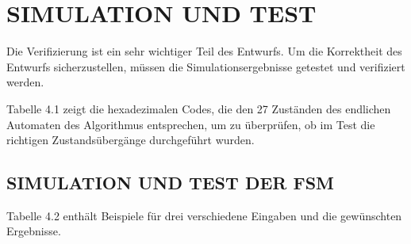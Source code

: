 \chapter{SIMULATION UND TEST}
\label{sec:implementation}

Die Verifizierung ist ein sehr wichtiger Teil des Entwurfs. Um die Korrektheit des Entwurfs sicherzustellen, müssen die Simulationsergebnisse getestet und verifiziert werden.

\vspace{\baselineskip}

\noindent Tabelle 4.1 zeigt die hexadezimalen Codes, die den 27 Zuständen des endlichen Automaten des Algorithmus entsprechen, um zu überprüfen, ob im Test die richtigen Zustandsübergänge durchgeführt wurden.

\begin{table}[H]
    \caption{Hexadezimale Codierung der Zustände}
\end{table}

\section{SIMULATION UND TEST DER FSM}

Tabelle 4.2 enthält Beispiele für drei verschiedene Eingaben und die gewünschten Ergebnisse.

